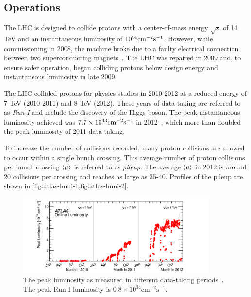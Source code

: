 \subsection{Operations}

The LHC is designed to collide protons with a center-of-mass energy $\sqrt s$ of 14 TeV and an instantaneous luminosity of $10^{34}\text{cm}^{-2} \text{s}^{-1}$. However, while commissioning in 2008, the machine broke due to a faulty electrical connection between two superconducting magnets~\cite{cern-incident}. The LHC was repaired in 2009 and, to ensure safer operation, began colliding protons below design energy and instantaneous luminosity in late 2009.

The LHC collided protons for physics studies in 2010-2012 at a reduced energy of 7 TeV (2010-2011) and 8 TeV (2012). These years of data-taking are referred to as \textit{Run-I} and include the discovery of the Higgs boson. The peak instantaneous luminosity achieved was $7.7 \times 10^{33}\text{cm}^{-2} \text{s}^{-1}$ in 2012~\cite{cern-run1}, which more than doubled the peak luminosity of 2011 data-taking. 

To increase the number of collisions recorded, many proton collisions are allowed to occur within a single bunch crossing. This average number of proton collisions per bunch crossing $\langle\mu\rangle$ is referred to as \textit{pileup}. The average $\langle\mu\rangle$ in 2012 is around 20 collisions per crossing and reaches as large as 35-40. Profiles of the pileup are shown in \cref{fig:atlas-lumi-1,fig:atlas-lumi-2}.

\begin{figure}[tp]
  \centering
  \includegraphics[width=0.90\textwidth]{figures/lhc-atlas/lumivstime}
  \caption{The peak luminosity as measured in different data-taking periods~\cite{atlas-lumi}. The peak Run-I luminosity is $0.8\times 10^{34} \text{cm}^{-2} \text{s}^{-1}$.}
  \label{fig:atlas-lumi-1}
\end{figure}


